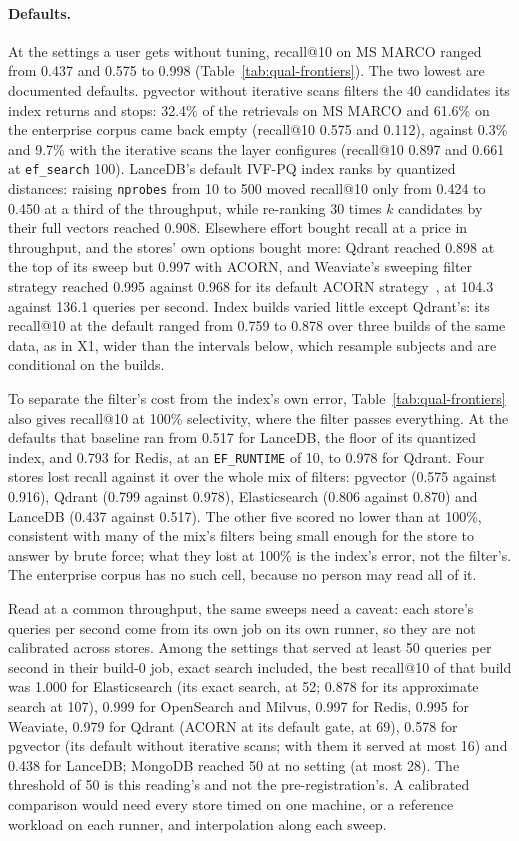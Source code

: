 \paragraph{Defaults.}
At the settings a user gets without tuning, recall@10 on MS MARCO ranged from 0.437 and 0.575 to
0.998 (Table~\ref{tab:qual-frontiers}). The two lowest are documented defaults. pgvector without
iterative scans filters the 40 candidates its index returns and stops: 32.4\% of the retrievals on MS
MARCO and 61.6\% on the enterprise corpus came back empty (recall@10 0.575 and 0.112), against 0.3\%
and 9.7\% with the iterative scans the layer configures (recall@10 0.897 and 0.661 at
\texttt{ef\_search} 100). LanceDB's default IVF-PQ index ranks by quantized distances: raising
\texttt{nprobes} from 10 to 500 moved recall@10 only from 0.424 to 0.450 at a third of the throughput,
while re-ranking 30 times $k$ candidates by their full vectors reached 0.908. Elsewhere effort bought
recall at a price in throughput, and the stores' own options bought more: Qdrant reached 0.898 at the
top of its sweep but 0.997 with ACORN, and Weaviate's sweeping filter strategy reached 0.995 against
0.968 for its default ACORN strategy~\cite{weaviate2026vectorindex}, at 104.3 against 136.1 queries
per second. Index builds varied little except Qdrant's: its recall@10 at the default ranged from
0.759 to 0.878 over three builds of the same data, as in X1, wider than the intervals below, which resample subjects and are conditional on the builds.

To separate the filter's cost from the index's own error, Table~\ref{tab:qual-frontiers} also gives
recall@10 at 100\% selectivity, where the filter passes everything. At the defaults that baseline
ran from 0.517 for LanceDB, the floor of its quantized index, and 0.793 for Redis, at an
\texttt{EF\_RUNTIME} of 10, to 0.978 for Qdrant. Four stores lost recall against it over the whole
mix of filters: pgvector (0.575 against 0.916), Qdrant (0.799 against 0.978), Elasticsearch (0.806
against 0.870) and LanceDB (0.437 against 0.517). The other five scored no lower than at 100\%,
consistent with many of the mix's filters being small enough for the store to answer by brute force;
what they lost at 100\% is the index's error, not the filter's. The enterprise corpus has no such
cell, because no person may read all of it.

Read at a common throughput, the same sweeps need a caveat: each store's queries per second come from
its own job on its own runner, so they are not calibrated across stores. Among the settings that
served at least 50 queries per second in their build-0 job, exact search included, the best recall@10
of that build was 1.000 for Elasticsearch (its exact search, at 52; 0.878 for its approximate search
at 107), 0.999 for OpenSearch and Milvus,
0.997 for Redis, 0.995 for Weaviate, 0.979 for Qdrant (ACORN at its default gate, at 69), 0.578 for
pgvector (its default without iterative scans; with them it served at most 16) and 0.438 for LanceDB;
MongoDB reached 50 at no setting (at most 28). The threshold of 50 is this reading's and not the pre-registration's. A calibrated comparison would need every store timed
on one machine, or a reference workload on each runner, and interpolation along each sweep.

